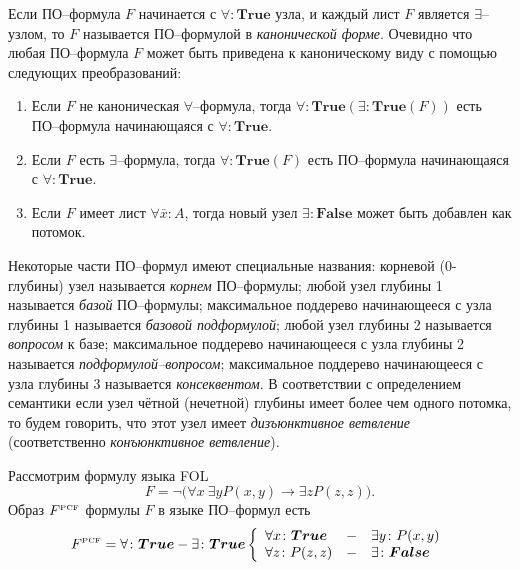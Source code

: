 Если ПО--формула $F$ начинается с $\forall\colon\boldsymbol{True}$ узла, и каждый лист $F$ является $\exists$--узлом, то $F$ называется ПО--формулой в {\em канонической форме}.
Очевидно что любая ПО--формула $F$ может быть приведена к каноническому виду с помощью следующих преобразований:
\begin{enumerate}
\item Если $F$ не каноническая $\forall$--формула, тогда $\forall\colon \boldsymbol{True}\left(\exists\colon \boldsymbol{True}\left(F\right)\right)$ есть ПО--формула начинающаяся с $\forall\colon\boldsymbol{True}$.
\item Если $F$ есть $\exists$--формула, тогда $\forall\colon \boldsymbol{True}\left(F\right)$ есть ПО--формула начинающаяся с $\forall\colon\boldsymbol{True}$.
\item Если $F$ имеет лист $\forall \bar{x}\colon A$, тогда новый узел $\exists\colon\boldsymbol{False}$ может быть добавлен как потомок.
\end{enumerate}


Некоторые части ПО--формул имеют специальные названия: корневой (0-глубины) узел называется {\em корнем} ПО--формулы; любой узел глубины 1 называется {\em базой} ПО--формулы; максимальное поддерево начинающееся с узла глубины 1 называется {\em базовой подформулой}; любой узел глубины 2 называется {\em вопросом} к базе; максимальное поддерево начинающееся с узла глубины 2 называется {\em подформулой--вопросом}; максимальное поддерево начинающееся с узла глубины 3 называется {\em консеквентом}. В соответствии с определением семантики если узел чётной (нечетной) глубины имеет более чем одного потомка, то будем говорить, что этот узел имеет {\em дизъюнктивное ветвление} (соответственно {\em конъюнктивное ветвление}).

\begin{example}
Рассмотрим формулу языка FOL
$$F= \neg\bigl(\forall x\:\exists y P(x,y)\rightarrow \exists z P(z,z)\bigr).$$
Образ $F^{\text{\tiny{PCF}}}$ формулы $F$ в языке ПО--формул есть
$$F^{\text{\tiny{PCF}}} = \forall\colon \boldsymbol{True}-\exists\colon\boldsymbol{True} \left\{
\begin{array}{lcl}
 \forall x\colon\boldsymbol{True} & - & \exists y\colon P(x,y) \\
 \forall z\colon P(z,z) & - & \exists\colon\boldsymbol{False}
\end{array}
\right.$$

\end{example}


